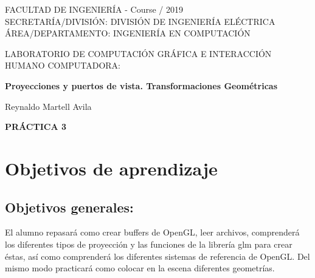 \documentclass[11pt, english]{article}
\makeatletter
\newcounter{unomenos}
\gdef\@date{ Course \arabic{unomenos}/ 2019}
\makeatother
\begin{document}
\begin{titlepage}
\begin{center}
FACULTAD DE INGENIERÍA - \@date\\
\vspace*{0.15in}
SECRETARÍA/DIVISIÓN: DIVISIÓN DE INGENIERÍA ELÉCTRICA \\
ÁREA/DEPARTAMENTO: INGENIERÍA EN COMPUTACIÓN \\
\vspace*{0.4in}
\begin{large}
LABORATORIO DE COMPUTACIÓN GRÁFICA E INTERACCIÓN HUMANO COMPUTADORA:\\
\end{large}
\vspace*{0.2in}
\begin{Large}
\textbf{Proyecciones y puertos de vista. Transformaciones Geométricas } \\
\end{Large}
\vspace*{0.3in}
\vspace*{0.3in}
\begin{large}
Reynaldo Martell Avila \\
\end{large}
\vspace*{0.5in}
\vspace*{0.5in}
\begin{large}
\textbf{PRÁCTICA 3} \\
\end{large}
\end{center}
\end{titlepage}

\newcommand{\CC}{C\nolinebreak\hspace{-.05em}\raisebox{.4ex}{\tiny\bf +}\nolinebreak\hspace{-.10em}\raisebox{.4ex}{\tiny\bf +}}
\def\CC{{C\nolinebreak[4]\hspace{-.05em}\raisebox{.4ex}{\tiny\bf ++}}}

\tableofcontents

\newpage
\section{Objetivos de aprendizaje}
\subsection{Objetivos generales:}
El alumno repasará como crear buffers de OpenGL, leer archivos, comprenderá los
diferentes tipos de proyección y las funciones de la librería glm para crear éstas, así como
comprenderá los diferentes sistemas de referencia de OpenGL. Del mismo modo practicará
como colocar en la escena diferentes geometrías.
\end{document}
